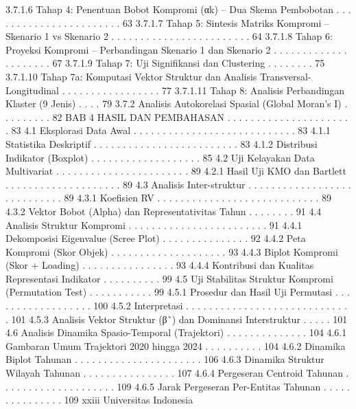 3.7.1.6 Tahap 4: Penentuan Bobot Kompromi (αk) – Dua Skema
Pembobotan . . . . . . . . . . . . . . . . . . . . . . . 63
3.7.1.7 Tahap 5: Sintesis Matriks Kompromi – Skenario 1 vs
Skenario 2 . . . . . . . . . . . . . . . . . . . . . . . . 64
3.7.1.8 Tahap 6: Proyeksi Kompromi – Perbandingan Skenario
1 dan Skenario 2 . . . . . . . . . . . . . . . . . . . . . 67
3.7.1.9 Tahap 7: Uji Signifikansi dan Clustering . . . . . . . . 75
3.7.1.10 Tahap 7a: Komputasi Vektor Struktur dan Analisis
Transversal-Longitudinal . . . . . . . . . . . . . . . . . 77
3.7.1.11 Tahap 8: Analisis Perbandingan Klaster (9 Jenis) . . . . 79
3.7.2 Analisis Autokorelasi Spasial (Global Moran’s I) . . . . . . . . . 82
BAB 4 HASIL DAN PEMBAHASAN . . . . . . . . . . . . . . . . . . . . . . 83
4.1 Eksplorasi Data Awal . . . . . . . . . . . . . . . . . . . . . . . . . . . . 83
4.1.1 Statistika Deskriptif . . . . . . . . . . . . . . . . . . . . . . . . . 83
4.1.2 Distribusi Indikator (Boxplot) . . . . . . . . . . . . . . . . . . . 85
4.2 Uji Kelayakan Data Multivariat . . . . . . . . . . . . . . . . . . . . . . . 89
4.2.1 Hasil Uji KMO dan Bartlett . . . . . . . . . . . . . . . . . . . . 89
4.3 Analisis Inter-struktur . . . . . . . . . . . . . . . . . . . . . . . . . . . . 89
4.3.1 Koefisien RV . . . . . . . . . . . . . . . . . . . . . . . . . . . . 89
4.3.2 Vektor Bobot (Alpha) dan Representativitas Tahun . . . . . . . . 91
4.4 Analisis Struktur Kompromi . . . . . . . . . . . . . . . . . . . . . . . . 91
4.4.1 Dekomposisi Eigenvalue (Scree Plot) . . . . . . . . . . . . . . . 92
4.4.2 Peta Kompromi (Skor Objek) . . . . . . . . . . . . . . . . . . . . 93
4.4.3 Biplot Kompromi (Skor + Loading) . . . . . . . . . . . . . . . . 93
4.4.4 Kontribusi dan Kualitas Representasi Indikator . . . . . . . . . . 99
4.5 Uji Stabilitas Struktur Kompromi (Permutation Test) . . . . . . . . . . . 99
4.5.1 Prosedur dan Hasil Uji Permutasi . . . . . . . . . . . . . . . . . . 100
4.5.2 Interpretasi . . . . . . . . . . . . . . . . . . . . . . . . . . . . . 101
4.5.3 Analisis Vektor Struktur (β˜) dan Dominansi Interstruktur . . . . . 101
4.6 Analisis Dinamika Spasio-Temporal (Trajektori) . . . . . . . . . . . . . . 104
4.6.1 Gambaran Umum Trajektori 2020 hingga 2024 . . . . . . . . . . 104
4.6.2 Dinamika Biplot Tahunan . . . . . . . . . . . . . . . . . . . . . . 106
4.6.3 Dinamika Struktur Wilayah Tahunan . . . . . . . . . . . . . . . . 107
4.6.4 Pergeseran Centroid Tahunan . . . . . . . . . . . . . . . . . . . . 109
4.6.5 Jarak Pergeseran Per-Entitas Tahunan . . . . . . . . . . . . . . . 109
xxiii Universitas Indonesia

